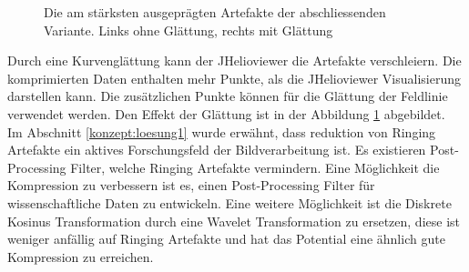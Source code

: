 \begin{figure}[!htbp]
	\center
	\caption{Die am stärksten ausgeprägten Artefakte der abschliessenden Variante. Links ohne Glättung, rechts mit Glättung}
	\label{resultate:loesung1:dct:final:artefakte}
\end{figure}
Durch eine Kurvenglättung kann der JHelioviewer die Artefakte verschleiern. Die komprimierten Daten enthalten mehr Punkte, als die JHelioviewer Visualisierung darstellen kann. Die zusätzlichen Punkte können für die Glättung der Feldlinie verwendet werden. Den Effekt der Glättung ist in der Abbildung \ref{resultate:loesung1:dct:final:artefakte} abgebildet.\\
Im Abschnitt \ref{konzept:loesung1} wurde erwähnt, dass reduktion von Ringing Artefakte ein aktives Forschungsfeld der Bildverarbeitung ist. Es existieren Post-Processing Filter, welche Ringing Artefakte vermindern. Eine Möglichkeit die Kompression zu verbessern ist es, einen Post-Processing Filter für wissenschaftliche Daten zu entwickeln. Eine weitere Möglichkeit ist die Diskrete Kosinus Transformation durch eine Wavelet Transformation zu ersetzen, diese ist weniger anfällig auf Ringing Artefakte und hat das Potential eine ähnlich gute Kompression zu erreichen.

